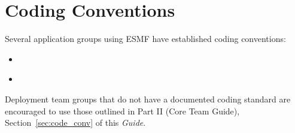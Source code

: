 
\section{Coding Conventions}
\label{sec:app_code_conv}

Several application groups using ESMF have established coding 
conventions:
\begin{itemize}
\item {}\cite{FMSdevguide}
\item {}\cite{CCSMdevguide}
\end{itemize}

Deployment team groups that do not have a documented coding standard are
encouraged to use those outlined in Part II (Core Team Guide), 
Section~\ref{sec:code_conv} of this {\it Guide}. 



